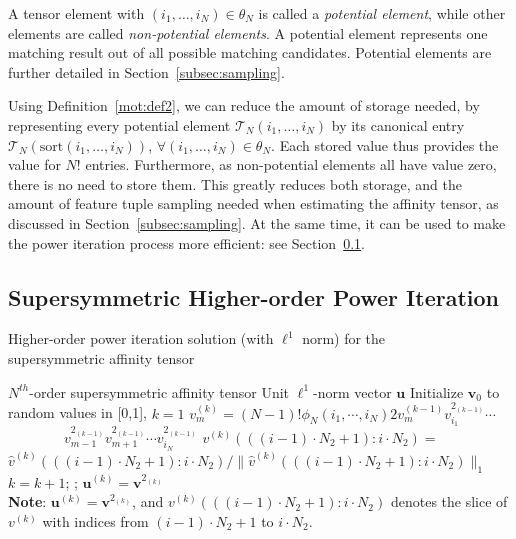 A tensor element with $(i_1,\ldots,i_N)\in \theta_N$ is called a \emph{potential element}, while other elements are called \emph{non-potential elements}.
A potential element represents one matching result out of all possible matching candidates.
Potential elements are further detailed in  Section~\ref{subsec:sampling}.

Using Definition~\ref{mot:def2}, we can reduce the amount of storage needed, 
by representing every potential element $\mathcal{T}_N(i_1,\ldots,i_N)$ by its canonical entry $\mathcal{T}_N(\mathrm{sort}(i_1,\ldots,i_N))$, $\forall (i_1,\ldots,i_N)\in \theta_N$. 
Each stored value thus provides the value for $N!$ entries.
Furthermore, as non-potential elements all have value zero, there is no need to store them.
This greatly reduces both storage, and the amount of feature tuple sampling
needed when estimating the affinity tensor, as discussed in Section~\ref{subsec:sampling}.
At the same time, it can be used to make the power iteration process more efficient: see Section~\ref{subsec:oursymmhopm}.

\subsection{Supersymmetric Higher-order Power Iteration}
\label{subsec:oursymmhopm}

\begin{algorithm}[!t]
\caption{\small Higher-order power iteration solution (with $\mathcal{\ell}^1$ norm) for the \protect\\
         \mbox{}\hspace{15ex}\small supersymmetric affinity tensor }
\label{alg2}
\begin{algorithmic}[1]
\REQUIRE \small $N^{th}$-order supersymmetric affinity tensor
\ENSURE  \small Unit $\mathcal{\ell}^1$-norm vector $\boldsymbol{u}$
\STATE   \small \; Initialize $\boldsymbol{v}_0$ to random values in [0,1], $k=1$
\REPEAT
        \STATE $v_{m}^{(k)}=(N-1)!\phi_N(i_1,\cdots , i_N) 2v_{m}^{(k-1)}v_{i_1}^{2_{(k-1)}}\cdots$ \\
                 $\qquad \qquad v_{m-1}^{2_{(k-1)}}v_{m+1}^{2_{(k-1)}}\cdots v_{i_N}^{2_{(k-1)}}$
        \ENDFOR
        \STATE $v^{(k)}(((i-1)\cdot N_2+1) : i\cdot N_2)=$   \protect\\
               $\hat{v}^{(k)}(((i-1)\cdot N_2+1) : i\cdot N_2)/\lVert \hat{v}^{(k)}(((i-1)\cdot N_2+1):i\cdot N_2)\lVert_1$
        \ENDFOR
    \ENDFOR
    \STATE $k=k+1$;
;
\STATE   \small \; $\boldsymbol{u}^{(k)}=\boldsymbol{v}^{2_{(k)}}$ \protect\\
       \small \textbf{Note}: $\boldsymbol{u}^{(k)}=\boldsymbol{v}^{2_{(k)}}$,
       \small and $v^{(k)}(((i-1)\cdot N_2+1) : i\cdot N_2)$ denotes the slice of $v^{(k)}$ with
       \small indices from $(i-1)\cdot N_2+1$ to $i\cdot N_2$.
\end{algorithmic}
\end{algorithm}

